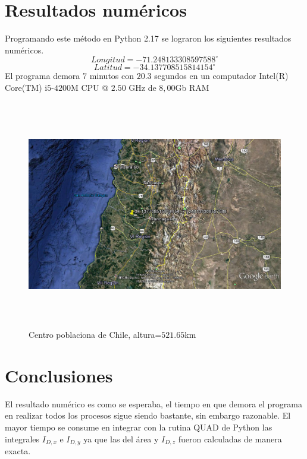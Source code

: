 \documentclass[20pt]{report}
\begin{document}
\begin{itemize}
\label{cap.introduccion}\section{Resultados num\'ericos} 
Programando este m\'etodo en Python 2.17 se lograron los siguientes resultados num\'ericos. 
\[Longitud=-71.248133308597588 ^\circ \]
\[Latitud=-34.137708515814154^\circ \]
El programa demora $7$ minutos con $20.3$ segundos en un computador Intel(R) Core(TM) i$5$-$4200$M CPU @ $2.50$ GHz de $8,00$Gb RAM
\begin{figure}[H]
\begin{center}
\includegraphics[width=15cm, height=10cm]{centro2.png}
\vspace{-0.5cm} %
\caption{Centro poblaciona de Chile, altura=$521.65$km}
\label{Label para referencia}
\end{center}
\end{figure}
\pagebreak

\section{Conclusiones}
El resultado num\'erico es como se esperaba, el tiempo  en que demora el programa en realizar todos los procesos sigue siendo bastante, sin embargo  razonable. El mayor tiempo se consume en  integrar con la rutina QUAD de Python  las integrales $I_{D,x}$ e $I_{D,y}$ ya que las del \'area y $I_{D,z}$ fueron calculadas de manera exacta.\\


\end{itemize}
\end{document}
